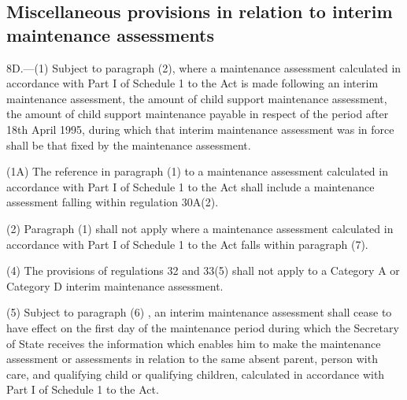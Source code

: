 \documentclass[a4paper,12pt]{article}
\begin{document}
\subsection[8D. Miscellaneous provisions in relation to interim maintenance assessments]{\sloppy Miscellaneous provisions in relation to interim maintenance assessments}

8D.—(1) Subject to paragraph (2), where a maintenance assessment calculated in accordance with Part I of Schedule 1 to the Act is made following an interim maintenance assessment, the amount of child support maintenance assessment, the amount of child support maintenance payable in respect of the period after 18th April 1995, during which that interim maintenance assessment was in force shall be that fixed by the maintenance assessment.

(1A) The reference in paragraph (1) to a maintenance assessment calculated in accordance with Part I of Schedule 1 to the Act shall include a maintenance assessment falling within regulation 30A(2).

(2) Paragraph (1) shall not apply where a maintenance assessment calculated in accordance with Part I of Schedule 1 to the Act falls within paragraph (7).


(4) The provisions of regulations 
32 and 33(5)  %
shall not apply to a Category A or Category D interim maintenance assessment.

(5) Subject to paragraph (6)%
, an interim maintenance assessment shall cease to have effect on the first day of the maintenance period during which the Secretary of State receives the information which enables 
him  %
to make the maintenance assessment or assessments in relation to the same absent parent, person with care, and qualifying child or qualifying children, calculated in accordance with Part I of Schedule 1 to the Act.
\end{document}
